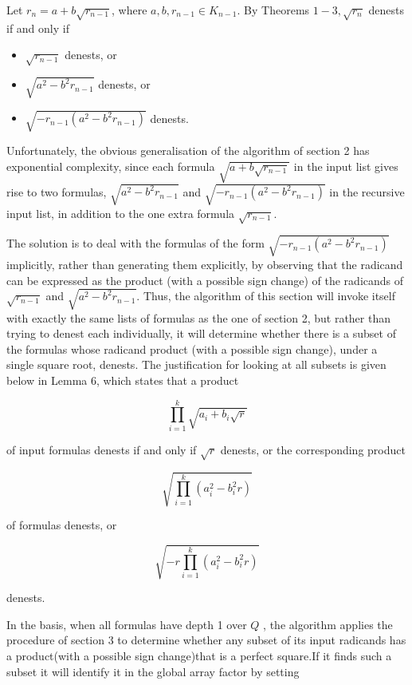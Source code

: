 \documentclass[11pt,letterpaper]{article}
\begin{document}
Let $r_{n}=a+b \sqrt{r_{n-1}}$, where $a, b, r_{n-1} \in K_{n-1}$. By Theorems $1-3, \sqrt{r_{n}}$ denests if and only if

\begin{itemize}
  \item[(i)] $\sqrt{r_{n-1}}$ denests, or
  \item[(ii)] $\sqrt{a^{2}-b^{2} r_{n-1}}$ denests, or
  \item[(iii)] $\sqrt{-r_{n-1}\left(a^{2}-b^{2} r_{n-1}\right)}$ denests.
\end{itemize}

Unfortunately, the obvious generalisation of the algorithm of section 2 has exponential complexity, since each formula $\sqrt{a+b \sqrt{r_{n-1}}}$ in the input list gives rise to two formulas, $\sqrt{a^{2}-b^{2} r_{n-1}}$ and $\sqrt{-r_{n-1}\left(a^{2}-b^{2} r_{n-1}\right)}$ in the recursive input list, in addition to the one extra formula $\sqrt{r_{n-1}}$.

The solution is to deal with the formulas of the form $\sqrt{-r_{n-1}\left(a^{2}-b^{2} r_{n-1}\right)}$ implicitly, rather than generating them explicitly, by observing that the radicand can be expressed as the product (with a possible sign change) of the radicands of $\sqrt{r_{n-1}}$ and $\sqrt{a^{2}-b^{2} r_{n-1}}$. Thus, the algorithm of this section will invoke itself with exactly the same lists of formulas as the one of section 2, but rather than trying to denest each individually, it will determine whether there is a subset of the formulas whose radicand product (with a possible sign change), under a single square root, denests. The justification for looking at all subsets is given below in Lemma 6, which states that a product

\[
\prod_{i=1}^{k} \sqrt{a_{i}+b_{i} \sqrt{r}}
\]

of input formulas denests if and only if $\sqrt{r}$ denests, or the corresponding product

\[
\sqrt{\prod_{i=1}^k(a_i^2-b_i^2r)}
\]

of formulas denests, or

\[
\sqrt{-r\prod_{i=1}^k(a_i^2-b_i^2r)}
\]

denests.

In the basis, when all formulas have depth 1 over $Q$ , the algorithm applies the procedure of section 3 to determine whether any subset of its input radicands has a product(with a possible sign change)that is a perfect square.If it finds such a subset it will identify it in the global array factor by setting
\end{document}
